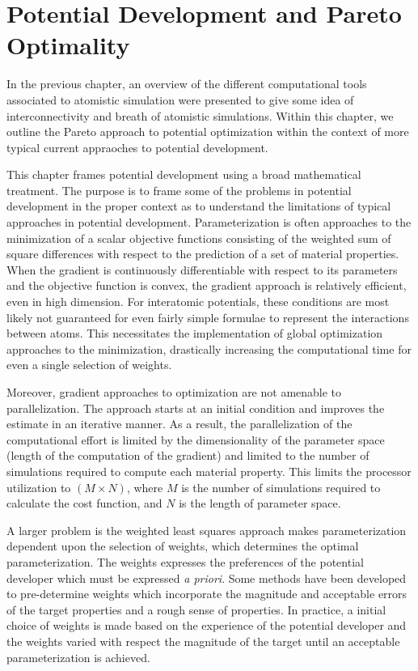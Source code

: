 \chapter{Potential Development and Pareto Optimality}

In the previous chapter, an overview of the different computational tools associated to atomistic simulation were presented to give some idea of interconnectivity and breath of atomistic simulations.  Within this chapter, we outline the Pareto approach to potential optimization within the context of more typical current appraoches to potential development.

This chapter frames potential development using a broad mathematical treatment.  The purpose is to frame some of the problems in potential development in the proper context as to understand the limitations of typical approaches in potential development.  Parameterization is often approaches to the minimization of a scalar objective functions consisting of the weighted sum of square differences with respect to the prediction of a set of material properties.  When the gradient is continuously differentiable with respect to its parameters and the objective function is convex, the gradient approach is relatively efficient, even in high dimension.  For interatomic potentials, these conditions are most likely not guaranteed for even fairly simple formulae to represent the interactions between atoms.  This necessitates the implementation of global optimization approaches to the minimization, drastically increasing the computational time for even a single selection of weights.

Moreover, gradient approaches to optimization are not amenable to parallelization.  The approach starts at an initial condition and improves the estimate in an iterative manner.  As a result, the parallelization of the computational effort is limited by the dimensionality of the parameter space (length of the computation of the gradient) and limited to the number of simulations required to compute each material property.  This limits the processor utilization to $(M \times N)$, where $M$ is the number of simulations required to calculate the cost function, and $N$ is the length of parameter space.

A larger problem is the weighted least squares approach makes parameterization dependent upon the selection of weights, which determines the optimal parameterization.   The weights expresses the preferences of the potential developer which must be expressed \emph{a priori}.  Some methods have been developed to pre-determine weights which incorporate the magnitude and acceptable errors of the target properties and a rough sense of properties.  In practice, a initial choice of weights is made based on the experience of the potential developer and the weights varied with respect the magnitude of the target until an acceptable parameterization is achieved.

